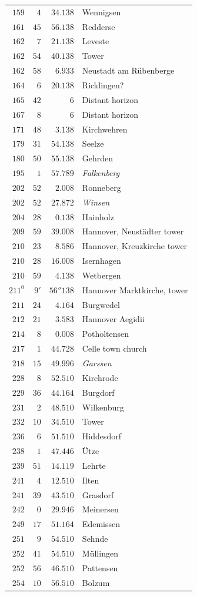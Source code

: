 \begin{longtable}{@{}rrrp{.61\linewidth}@{}}
\(159\)&\(4\)&\(34.138\)&\raggedright Wennigsen\tabularnewline
\(161\)&\(45\)&\(56.138\)&\raggedright Redderse\tabularnewline
\(162\)&\(7\)&\(21.138\)&\raggedright Leveste\tabularnewline
\(162\)&\(54\)&\(40.138\)&\raggedright Tower\tabularnewline
\(162\)&\(58\)&\(6.933\)&\raggedright Neustadt am Rübenberge\tabularnewline
\(164\)&\(6\)&\(20.138\)&\raggedright Ricklingen?\tabularnewline
\(165\)&\(42\)&\(6\)&\raggedright Distant horizon\tabularnewline
\(167\)&\(8\)&\(6\)&\raggedright Distant horizon\tabularnewline
\(171\)&\(48\)&\(3.138\)&\raggedright Kirchwehren\tabularnewline
\(179\)&\(31\)&\(54.138\)&\raggedright Seelze\tabularnewline
\(180\)&\(50\)&\(55.138\)&\raggedright Gehrden\tabularnewline
\(195\)&\(1\)&\(57.789\)&\raggedright \textit{Falkenberg}\tabularnewline
\(202\)&\(52\)&\(2.008\)&\raggedright Ronneberg\tabularnewline
\(202\)&\(52\)&\(27.872\)&\raggedright \textit{Winsen}\tabularnewline
\(204\)&\(28\)&\(0.138\)&\raggedright Hainholz\tabularnewline
\(209\)&\(59\)&\(39.008\)&\raggedright Hannover, Neustädter tower\tabularnewline
\(210\)&\(23\)&\(8.586\)&\raggedright Hannover, Kreuzkirche tower\tabularnewline
\(210\)&\(28\)&\(16.008\)&\raggedright Isernhagen\tabularnewline
\(210\)&\(59\)&\(4.138\)&\raggedright Wetbergen\tabularnewline
\(211^{0}\)&\(9'\)&\(56''138\)&\raggedright Hannover Marktkirche, tower\tabularnewline
\(211\)&\(24\)&\(4.164\)&\raggedright Burgwedel\tabularnewline
\(212\)&\(21\)&\(3.583\)&\raggedright Hannover Aegidii\tabularnewline
\(214\)&\(8\)&\(0.008\)&\raggedright Potholtensen\tabularnewline
\(217\)&\(1\)&\(44.728\)&\raggedright Celle town church\tabularnewline
\(218\)&\(15\)&\(49.996\)&\raggedright \textit{Garssen}\tabularnewline
\(228\)&\(8\)&\(52.510\)&\raggedright Kirchrode\tabularnewline
\(229\)&\(36\)&\(44.164\)&\raggedright Burgdorf\tabularnewline
\(231\)&\(2\)&\(48.510\)&\raggedright Wilkenburg\tabularnewline
\(232\)&\(10\)&\(34.510\)&\raggedright Tower\tabularnewline
\(236\)&\(6\)&\(51.510\)&\raggedright Hiddesdorf\tabularnewline
\(238\)&\(1\)&\(47.446\)&\raggedright Ütze\tabularnewline
\(239\)&\(51\)&\(14.119\)&\raggedright Lehrte\tabularnewline
\(241\)&\(4\)&\(12.510\)&\raggedright Ilten\tabularnewline
\(241\)&\(39\)&\(43.510\)&\raggedright Grasdorf\tabularnewline
\(242\)&\(0\)&\(29.946\)&\raggedright Meinersen\tabularnewline
\(249\)&\(17\)&\(51.164\)&\raggedright Edemissen\tabularnewline
\(251\)&\(9\)&\(54.510\)&\raggedright Sehnde\tabularnewline
\(252\)&\(41\)&\(54.510\)&\raggedright Müllingen\tabularnewline
\(252\)&\(56\)&\(46.510\)&\raggedright Pattensen\tabularnewline
\(254\)&\(10\)&\(56.510\)&\raggedright Bolzum\tabularnewline

\end{longtable}
